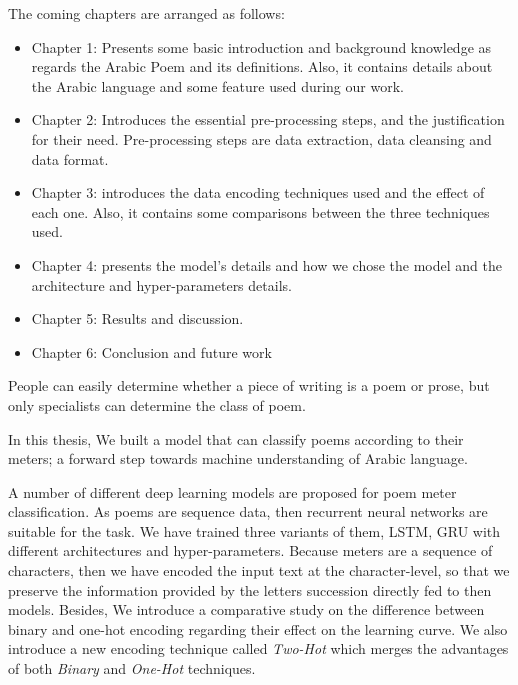 \newpage


\begin{spacing}{1}
The coming chapters are arranged as follows:
\begin{itemize}
  \item Chapter 1: Presents some basic introduction and background knowledge as regards the Arabic Poem and its definitions. Also, it contains details about the Arabic language and some feature used during our work.
  \item Chapter 2: Introduces the essential pre-processing steps, and the justification for their need. Pre-processing steps are data extraction, data cleansing and data format.
  \item Chapter 3: introduces the data encoding techniques used and the effect of each one. Also, it contains some comparisons between the three techniques used.
  \item Chapter 4: presents the model's details and how we chose the model and the architecture and hyper-parameters details.
  \item Chapter 5: Results and discussion.
  \item Chapter 6: Conclusion and future work
\end{itemize}


 \newpage
 



\begin{spacing}{1}


People can easily determine whether a piece of writing is a poem or prose, but only specialists can determine the class of poem.
  
In this thesis, We built a model that can classify poems according to their meters; a forward step towards machine understanding of Arabic language.

A number of different deep learning models are proposed for poem meter classification. As poems are sequence data, then recurrent neural networks are suitable for the task. We have trained three variants of them, LSTM, GRU with different architectures and hyper-parameters. Because meters are a sequence of characters, then we have encoded the input text at the character-level, so that we preserve the information provided by the letters succession directly fed to then models. Besides, We introduce a comparative study on the difference between binary and one-hot encoding regarding their effect on the learning curve. We also introduce a new encoding technique called \textit{Two-Hot} which merges the advantages of both \textit{Binary} and \textit{One-Hot} techniques.



\end{spacing}
\end{spacing}
